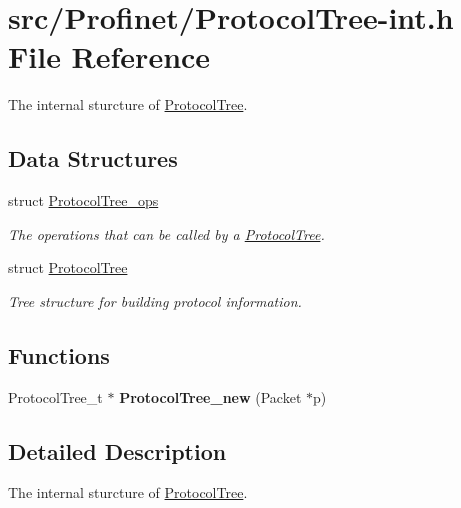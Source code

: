 \hypertarget{_protocol_tree-int_8h}{}\section{src/\+Profinet/\+Protocol\+Tree-\/int.h File Reference}
\label{_protocol_tree-int_8h}


The internal sturcture of \hyperlink{struct_protocol_tree}{Protocol\+Tree}.  


\subsection*{Data Structures}
\begin{DoxyCompactItemize}
\item 
struct \hyperlink{struct_protocol_tree__ops}{Protocol\+Tree\+\_\+ops}
\begin{DoxyCompactList}\small\item\em The operations that can be called by a \hyperlink{struct_protocol_tree}{Protocol\+Tree}. \end{DoxyCompactList}\item 
struct \hyperlink{struct_protocol_tree}{Protocol\+Tree}
\begin{DoxyCompactList}\small\item\em Tree structure for building protocol information. \end{DoxyCompactList}\end{DoxyCompactItemize}
\subsection*{Functions}
\begin{DoxyCompactItemize}
\item 
\hypertarget{_protocol_tree-int_8h_ad95344166c369a93bf4be9c0b894efc2}{}Protocol\+Tree\+\_\+t $\ast$ {\bfseries Protocol\+Tree\+\_\+new} (Packet $\ast$p)\label{_protocol_tree-int_8h_ad95344166c369a93bf4be9c0b894efc2}

\end{DoxyCompactItemize}


\subsection{Detailed Description}
The internal sturcture of \hyperlink{struct_protocol_tree}{Protocol\+Tree}. 

